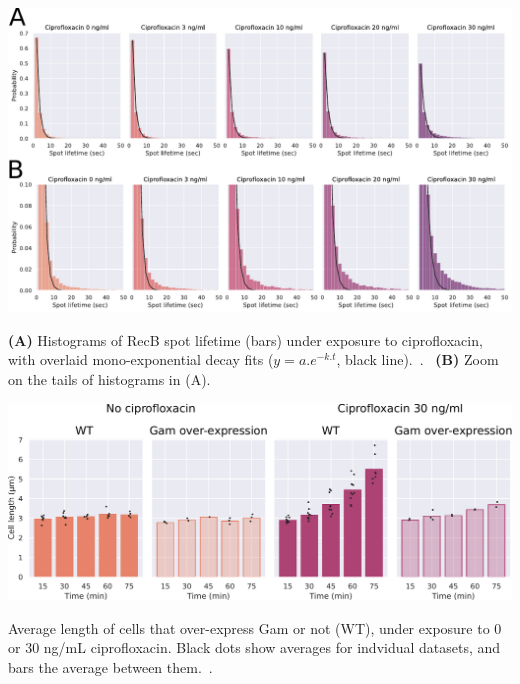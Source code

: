 \begin{suppfigure*}[htbp]
    \begin{center}
    \includegraphics[width=\linewidth]{SI_Figures/Monoexp_fits_cipro.pdf}
    \end{center}
    \caption{\textbf{(A)} Histograms of RecB spot lifetime (bars) under exposure to ciprofloxacin, with overlaid mono-exponential decay fits ($y=a.e^{-k.t}$, black line).\ .\  \textbf{(B)} Zoom on the tails of histograms in (A).}\label{SIFig:monoexp_fits}
\end{suppfigure*}

\begin{suppfigure*}[htbp]
    \begin{center}
    \includegraphics[width=\linewidth]{SI_Figures/Cell_length_Gam.pdf}
    \end{center}
    \caption{Average length of cells that over-express Gam or not (WT), under exposure to 0 or 30 ng/mL ciprofloxacin. Black dots show averages for indvidual datasets, and bars the average between them.\ .}\label{SIFig:Gam_cell_length}
\end{suppfigure*}


